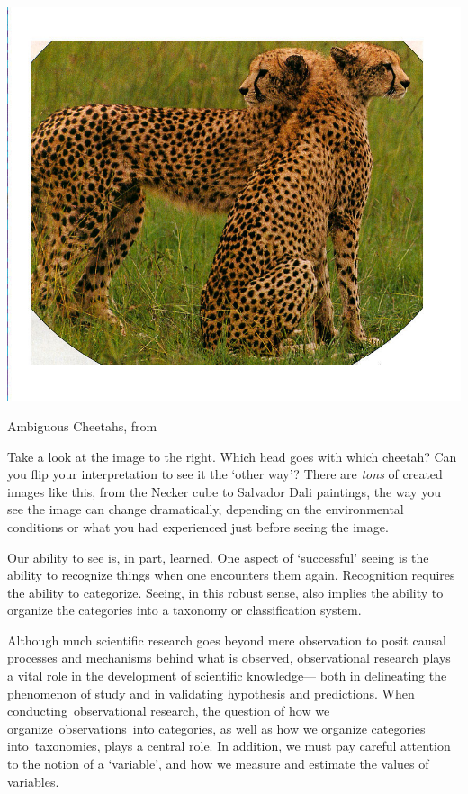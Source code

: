 \begin{refsection}
\begin{marginfigure}
\begin{center}
     \includegraphics[scale=0.50]{../images/AmbigCheeta.jpg}
\end{center}
 \caption{Ambiguous Cheetahs, from  ~\citep{Pitts:2007km}}
\label{fig: ambiguouscheetahs}
\end{marginfigure}

Take a look at the image to the right. Which head goes with which cheetah? Can you flip your interpretation to see it the `other way'? There are \emph{tons} of created images like this, from the Necker cube to Salvador Dali paintings, the way you see the image can change dramatically, depending on the environmental conditions or what you had experienced just before seeing the image.

Our ability to see is, in part, learned. One aspect of `successful' seeing is the ability to recognize things when one encounters them again. Recognition requires the ability to categorize. Seeing, in this robust sense, also implies the ability to organize the categories into a taxonomy or classification system.

Although much scientific research goes beyond mere observation to posit causal processes and mechanisms behind what is observed, observational research plays a vital role in the development of scientific knowledge--- both in delineating the phenomenon of study and in validating hypothesis and predictions. When conducting observational research, the question of how we organize observations into categories, as well as how we organize categories into taxonomies, plays a central role. In addition, we must pay careful attention to the notion of a `variable', and how we measure and estimate the values of variables.


\end{refsection}
